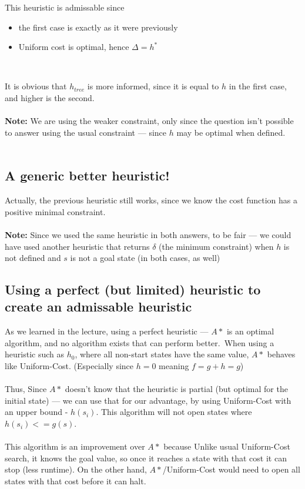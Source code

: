 \documentclass{article}
\begin{document}
This heuristic is admissable since
\begin{itemize}
\item the first case is exactly as it were previously
\item Uniform cost is optimal, hence $\Delta = h^* $
\end{itemize}
\ 

It is obvious that $h_{tree}$ is more informed, since it is equal to $h$ in the first case, and higher is the second.
\\~\\
\textbf{Note: } We are using the weaker constraint, only since the question isn't possible to answer using the usual constraint --- since $h$ may be optimal when defined.
\\~\\

\subsection*{A generic better heuristic!}
Actually, the previous heuristic still works, since we know the cost function has a positive minimal constraint.
\\~\\
\textbf{Note: } Since we used the same heuristic in both answers, to be fair --- we could have used another heuristic that returns $\delta$ (the minimum constraint) when $h$ is not defined and $s$ is not a goal state (in both cases, as well)

\subsection*{Using a perfect (but limited) heuristic to create an admissable heuristic}
As we learned in the lecture, using a perfect heuristic --- $A*$ is an optimal algorithm, and no algorithm exists that can perform better.\ 
When using a heuristic such as $h_0$, where all non-start states have the same value, $A*$ behaves like Uniform-Cost. (Especially since $h=0$ meaning $f=g+h=g$)
\\~\\
Thus, Since $A*$ doesn't know that the heuristic is partial (but optimal for the initial state) --- we can use that for our advantage, by using Uniform-Cost with an upper bound - $h(s_i)$. This algorithm will not open states where $h(s_i) <= g(s)$.
\\~\\
This algorithm is an improvement over $A*$ because Unlike usual Uniform-Cost search, it knows the goal value, so once it reaches a state with that cost it can stop (less runtime). On the other hand, $A*$/Uniform-Cost would need to open all states with that cost before it can halt.
\end{document}
